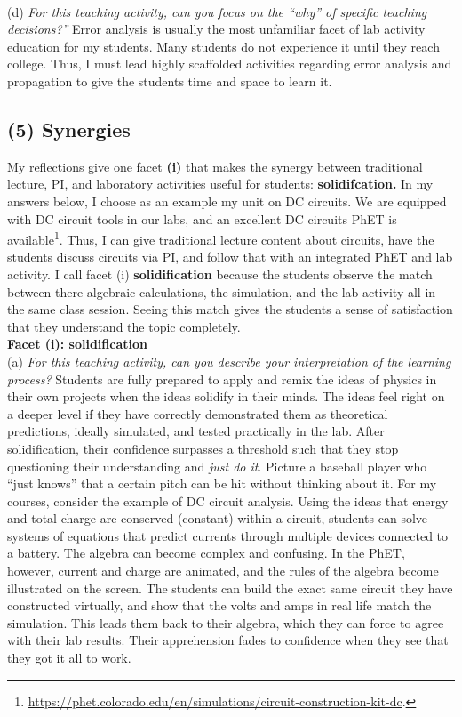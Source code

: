 \documentclass[../../../main.tex]{subfiles}
\begin{document}
\\
\vspace{0.25cm}
(d) \textit{For this teaching activity, can you focus on the ``why'' of specific teaching decisions?''} Error analysis is usually the most unfamiliar facet of lab activity education for my students.  Many students do not experience it until they reach college.  Thus, I must lead highly scaffolded activities regarding error analysis and propagation to give the students time and space to learn it.

\subsection{(5) Synergies}

My reflections give one facet \textbf{(i)} that makes the synergy between traditional lecture, PI, and laboratory activities useful for students: \textbf{solidifcation.}  In my answers below, I choose as an example my unit on DC circuits.  We are equipped with DC circuit tools in our labs, and an excellent DC circuits PhET is available\footnote{\url{https://phet.colorado.edu/en/simulations/circuit-construction-kit-dc}.}.  Thus, I can give traditional lecture content about circuits, have the students discuss circuits via PI, and follow that with an integrated PhET and lab activity.  I call facet (i) \textbf{solidification} because the students observe the match between there algebraic calculations, the simulation, and the lab activity all in the same class session.  Seeing this match gives the students a sense of satisfaction that they understand the topic completely.
\\
\vspace{0.25cm}
\textbf{Facet (i): solidification}
\\
(a) \textit{For this teaching activity, can you describe your interpretation of the learning process?}  Students are fully prepared to apply and remix the ideas of physics in their own projects when the ideas solidify in their minds.  The ideas feel right on a deeper level if they have correctly demonstrated them as theoretical predictions, ideally simulated, and tested practically in the lab.  After solidification, their confidence surpasses a threshold such that they stop questioning their understanding and \textit{just do it}.  Picture a baseball player who ``just knows'' that a certain pitch can be hit without thinking about it.  For my courses, consider the example of DC circuit analysis.  Using the ideas that energy and total charge are conserved (constant) within a circuit, students can solve systems of equations that predict currents through multiple devices connected to a battery.  The algebra can become complex and confusing.  In the PhET, however, current and charge are animated, and the rules of the algebra become illustrated on the screen.  The students can build the exact same circuit they have constructed virtually, and show that the volts and amps in real life match the simulation.  This leads them back to their algebra, which they can force to agree with their lab results.  Their apprehension fades to confidence when they see that they got it all to work.
\end{document}
